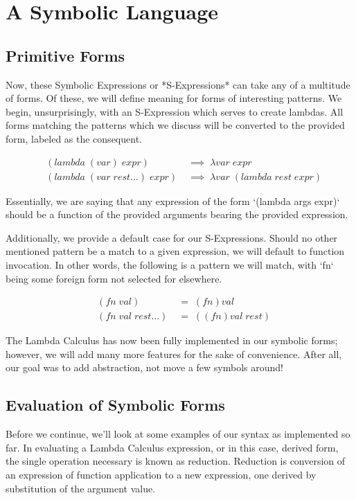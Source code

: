 \section{A Symbolic Language}
\subsection{Primitive Forms}
Now, these Symbolic Expressions or *S-Expressions* can take any of a multitude of
forms. Of these, we will define meaning for forms of interesting patterns. We
begin, unsurprisingly, with an S-Expression which serves to create lambdas. All
forms matching the patterns which we discuss will be converted to the provided
form, labeled as the consequent.

\begin{align*}
& (lambda \; (var) \; expr) \; &\implies \; \lambda var \; expr
\\& (lambda \; (var \; rest\dots) \; expr) \; &\implies \; \lambda var \; (lambda \; rest \; expr)
\end{align*}

Essentially, we are saying that any expression of the form `(lambda args expr)`
should be a function of the provided arguments bearing the provided expression. 

Additionally, we provide a default case for our S-Expressions. Should no other
mentioned pattern be a match to a given expression, we will default to function
invocation. In other words, the following is a pattern we will match, with `fn`
being some foreign form not selected for elsewhere. 

\begin{align*}
& (fn \; val) \; &= \; (fn)val
\\& (fn \; val \; rest\dots) \; &= \; ((fn)val \; rest)
\end{align*}

The Lambda Calculus has now been fully implemented in our symbolic forms; however, 
we will add many more features for the sake of convenience. After all, our goal
was to add abstraction, not move a few symbols around!


\subsection{Evaluation of Symbolic Forms}
Before we continue, we'll look at some examples of our syntax as implemented so
far. In evaluating a Lambda Calculus expression, or in this case, derived form,
the single operation necessary is known as reduction. Reduction is conversion of
an expression of function application to a new expression, one derived by
substitution of the argument value.

